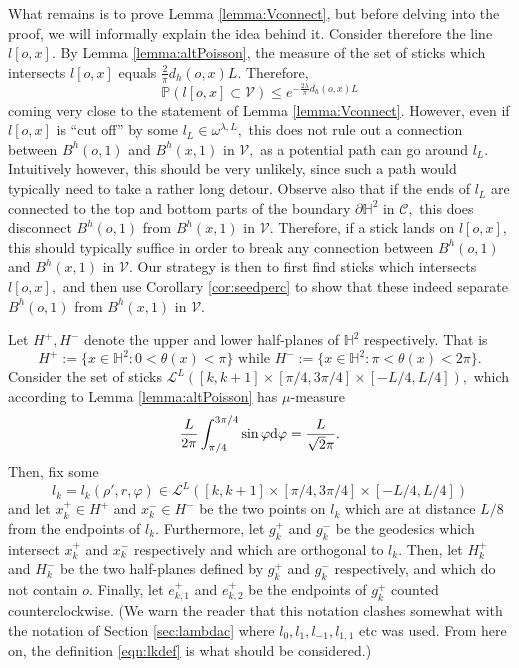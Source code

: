 \documentclass[a4paper,12pt]{article}
\newcommand{\BH}{{\mathbb{H}}}
\newcommand{\BP}{{\mathbb{P}}}
\newcommand{\CC}{{\mathcal{C}}}
\newcommand{\CL}{{\mathcal{L}}}
\newcommand{\CV}{{\mathcal{V}}}
\newcommand{\dd}{{\rm d}}
\begin{document}
What remains is to prove Lemma \ref{lemma:Vconnect}, but 
before delving into the proof, we will informally explain the idea behind it. 
Consider therefore the line $l[o,x].$ By Lemma \ref{lemma:altPoisson}, the measure 
of the set of sticks which intersects $l[o,x]$ equals $\frac{2}{\pi}d_h(o,x)L$.
Therefore,
\[
\BP(l[o,x]\subset \CV) \leq e^{-\frac{2\lambda }{\pi}d_h(o,x)L}
\]
coming very close to the statement of Lemma \ref{lemma:Vconnect}. However, even if $l[o,x]$
is ``cut off'' by some $l_L \in \omega^{\lambda,L},$ this does not rule out a connection 
between $B^h(o,1)$ and $B^h(x,1)$ in $\CV,$ as a potential path can go around $l_L$. 
Intuitively however, this should be very unlikely, since such a path would typically 
need to take a rather long detour. Observe also that
if the ends of $l_L$ are connected to the top and bottom parts
of the boundary $\partial \BH^2$ in $\CC,$ this does disconnect $B^h(o,1)$ from $B^h(x,1)$ 
in $\CV.$ 
 Therefore, if a stick lands on $l[o,x],$ this should typically 
suffice in order to break any connection between $B^h(o,1)$ and $B^h(x,1)$ in $\CV.$
Our strategy is then to first find sticks which intersects $l[o,x],$ and then 
use Corollary \ref{cor:seedperc} to show that these indeed separate $B^h(o,1)$ from 
$B^h(x,1)$ in $\CV.$


Let $H^+,H^-$ denote the upper and lower half-planes of $\BH^2$ respectively. That is
\[
H^+:=\{x\in \BH^2: 0<\theta(x)<\pi\} \textrm{ while }
H^-:=\{x\in \BH^2: \pi<\theta(x)<2\pi\}.
\]
Consider the set of sticks $\CL^L([k,k+1]\times [\pi/4,3\pi/4]\times[-L/4,L/4]),$ 
which according to Lemma \ref{lemma:altPoisson} has $\mu$-measure 
\begin{equation} \label{eqn:Lmeasure}
\frac{L}{2 \pi}\int_{\pi/4}^{3\pi/4}\sin \varphi \dd \varphi
=\frac{L}{\sqrt{2}\pi}.    
\end{equation}
Then, fix some
\begin{equation}\label{eqn:lkdef}
l_k=l_k(\rho',r,\varphi)\in \CL^L([k,k+1]\times [\pi/4,3\pi/4]\times[-L/4,L/4])    
\end{equation}
and let $x_k^+\in H^+$ and $x_k^- \in H^-$ be the two points on $l_k$ which are at distance 
$L/8$ from the endpoints of $l_k.$ Furthermore, let $g_k^+$ and $g_k^-$ be the geodesics 
which intersect $x_k^+$ and $x_k^-$ respectively and which are orthogonal to $l_k.$
Then, let $H_k^+$ and $H_k^-$ be the two half-planes defined by $g_k^+$ and $g_k^-$
respectively, and which do not contain $o.$ Finally, let $e_{k,1}^+$ and $e_{k,2}^+$
be the endpoints of $g_k^+$ counted counterclockwise. (We warn the reader that this notation 
clashes somewhat with the notation of Section \ref{sec:lambdac} where $l_0,l_1,l_{-1},l_{1,1}$
etc was used. From here on, the definition \eqref{eqn:lkdef} is what should be considered.) 
\end{document}
